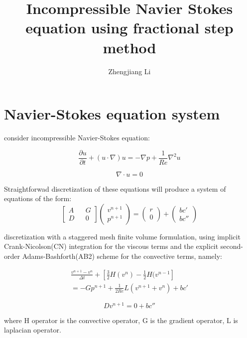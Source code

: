 \documentclass[11pt]{article}
\begin{document}
\title{Incompressible Navier Stokes equation using fractional step method}

\author{Zhengjiang Li}

\date{}

\maketitle

\section {Navier-Stokes equation system}

consider incompressible Navier-Stokes equation:

	$$ \frac{\partial u}{\partial t} + ( u \cdot \nabla) u = - \nabla p + \frac{1}{Re} \nabla^2 u $$

	$$ \nabla \cdot u = 0 $$

Straightforwad discretization of these equations will produce a system of equations of the form:
$$ 
\begin{bmatrix} A && G \\ D && 0 \end{bmatrix} \begin{pmatrix} v^{n+1} \\ p^{n+1} \end{pmatrix} = \left( \begin{array}{c} r \\ 0 \end{array} \right) + \left ( \begin{array}{c} bc' \\ bc'' \end{array} \right) $$

discretization with a staggered mesh finite volume formulation, using implicit Crank-Nicolson(CN) integration for the viscous terms and the explicit second-order Adams-Bashforth(AB2) scheme for the convective terms, namely:

\begin{align*}
  \frac{v^{n+1} - v^n}{\Delta t} + [\frac{3}{2} H(v^n) - \frac{1}{2} H(v^{n-1}] \\
 = -G p^{n+1} + \frac{1}{2Re} L(v^{n+1} + v^n) + bc' 
\end{align*}

$$ D v^{n+1} = 0 + bc'' $$

where H operator is the convective operator, G is the gradient operator, L is laplacian operator.
\end{document}
